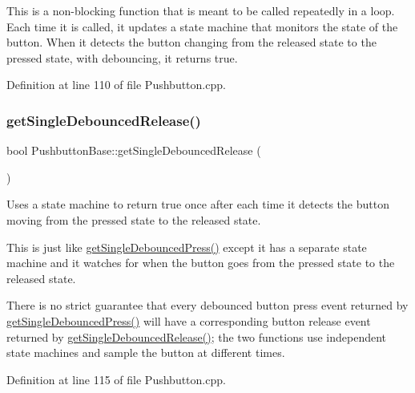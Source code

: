 This is a non-\/blocking function that is meant to be called repeatedly in a loop. Each time it is called, it updates a state machine that monitors the state of the button. When it detects the button changing from the released state to the pressed state, with debouncing, it returns true. 

Definition at line 110 of file Pushbutton.\+cpp.

\mbox{\label{class_pushbutton_base_ae568f5db0e8804247e0dcab72a311d42}} 
\subsubsection{\texorpdfstring{get\+Single\+Debounced\+Release()}{getSingleDebouncedRelease()}}
{\footnotesize\ttfamily bool Pushbutton\+Base\+::get\+Single\+Debounced\+Release (\begin{DoxyParamCaption}{ }\end{DoxyParamCaption})\hspace{0.3cm}{\ttfamily [inherited]}}



Uses a state machine to return true once after each time it detects the button moving from the pressed state to the released state. 

This is just like \hyperlink{class_pushbutton_base_a93953875c8b1c5f69dec3984774de296}{get\+Single\+Debounced\+Press()} except it has a separate state machine and it watches for when the button goes from the pressed state to the released state.

There is no strict guarantee that every debounced button press event returned by \hyperlink{class_pushbutton_base_a93953875c8b1c5f69dec3984774de296}{get\+Single\+Debounced\+Press()} will have a corresponding button release event returned by \hyperlink{class_pushbutton_base_ae568f5db0e8804247e0dcab72a311d42}{get\+Single\+Debounced\+Release()}; the two functions use independent state machines and sample the button at different times. 

Definition at line 115 of file Pushbutton.\+cpp.

\mbox{\label{class_pushbutton_a4990786220489fb5b6cf3af19b601a24}} 

